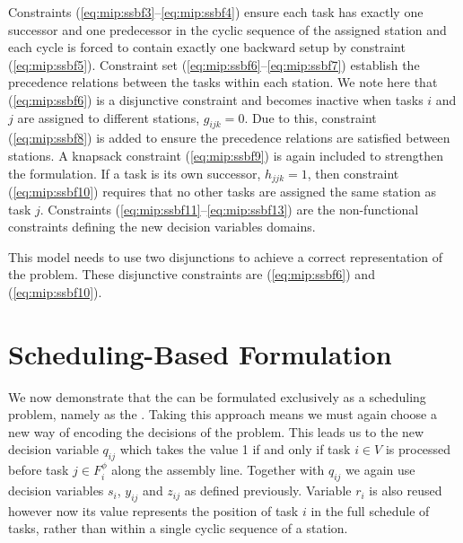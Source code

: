 Constraints (\ref{eq:mip:ssbf3}--\ref{eq:mip:ssbf4}) ensure each task has exactly one
successor and one predecessor in the cyclic sequence of the assigned station and
each cycle is forced to contain exactly one backward setup by constraint (\ref{eq:mip:ssbf5}).
Constraint set (\ref{eq:mip:ssbf6}--\ref{eq:mip:ssbf7}) establish the
precedence relations between the tasks within each station.
We note here that (\ref{eq:mip:ssbf6}) is a disjunctive constraint
and becomes inactive when tasks $i$ and $j$ are assigned
to different stations, \ie $g_{ijk}=0$.
Due to this, constraint (\ref{eq:mip:ssbf8}) is added to
ensure the precedence relations are satisfied between stations.
A knapsack constraint (\ref{eq:mip:ssbf9}) is again included 
to strengthen the formulation.
If a task is its own successor, \ie $h_{jjk}=1$, then
constraint (\ref{eq:mip:ssbf10}) requires that no other tasks are
assigned the same station as task $j$.
Constraints (\ref{eq:mip:ssbf11}--\ref{eq:mip:ssbf13}) are the non-functional
constraints defining the new decision variables domains.

This model needs to use two disjunctions to achieve
a correct representation of the problem.
These disjunctive constraints are
(\ref{eq:mip:ssbf6}) and (\ref{eq:mip:ssbf10}).

\section{Scheduling-Based Formulation}
\label{sec:mip:scbf}
We now demonstrate that the \sua{} can be formulated
exclusively as a scheduling problem, namely as the 
\scbf{}.
Taking this approach means we must again choose
a new way of encoding the decisions of the problem.
This leads us to the new decision variable $q_{ij}$
which takes the value 1 if and only if task $i\in V$ is processed
before task $j \in F_i^\phi$ along the assembly line.
Together with $q_{ij}$ we again use decision variables
$s_i$, $y_{ij}$ and $z_{ij}$ as defined previously.
Variable $r_i$ is also reused however now its value
represents the position of task $i$ in the full schedule of
tasks, rather than within a single cyclic sequence of 
a station.

